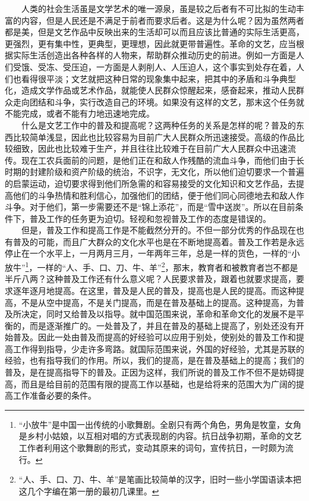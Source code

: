 \documentclass[cn,11pt,chinese]{elegantbook}
\begin{document}
　　人类的社会生活虽是文学艺术的唯一源泉，虽是较之后者有不可比拟的生动丰富的内容，但是人民还是不满足于前者而要求后者。这是为什么呢？因为虽然两者都是美，但是文艺作品中反映出来的生活却可以而且应该比普通的实际生活更高，更强烈，更有集中性，更典型，更理想，因此就更带普遍性。革命的文艺，应当根据实际生活创造出各种各样的人物来，帮助群众推动历史的前进。例如一方面是人们受饿、受冻、受压迫，一方面是人剥削人、人压迫人，这个事实到处存在着，人们也看得很平淡；文艺就把这种日常的现象集中起来，把其中的矛盾和斗争典型化，造成文学作品或艺术作品，就能使人民群众惊醒起来，感奋起来，推动人民群众走向团结和斗争，实行改造自己的环境。如果没有这样的文艺，那末这个任务就不能完成，或者不能有力地迅速地完成。\\
　　什么是文艺工作中的普及和提高呢？这两种任务的关系是怎样的呢？普及的东西比较简单浅显，因此也比较容易为目前广大人民群众所迅速接受。高级的作品比较细致，因此也比较难于生产，并且往往比较难于在目前广大人民群众中迅速流传。现在工农兵面前的问题，是他们正在和敌人作残酷的流血斗争，而他们由于长时期的封建阶级和资产阶级的统治，不识字，无文化，所以他们迫切要求一个普遍的启蒙运动，迫切要求得到他们所急需的和容易接受的文化知识和文艺作品，去提高他们的斗争热情和胜利信心，加强他们的团结，便于他们同心同德地去和敌人作斗争。对于他们，第一步需要还不是“锦上添花”，而是“雪中送炭”。所以在目前条件下，普及工作的任务更为迫切。轻视和忽视普及工作的态度是错误的。\\
　　但是，普及工作和提高工作是不能截然分开的。不但一部分优秀的作品现在也有普及的可能，而且广大群众的文化水平也是在不断地提高着。普及工作若是永远停止在一个水平上，一月两月三月，一年两年三年，总是一样的货色，一样的“小放牛”\footnote[7]{ “小放牛”是中国一出传统的小歌舞剧。全剧只有两个角色，男角是牧童，女角是乡村小姑娘，以互相对唱的方式表现剧的内容。抗日战争初期，革命的文艺工作者利用这个歌舞剧的形式，变动其原来的词句，宣传抗日，一时颇为流行。}，一样的“人、手、口、刀、牛、羊”\footnote[8]{ “人、手、口、刀、牛、羊”是笔画比较简单的汉字，旧时一些小学国语读本把这几个字编在第一册的最初几课里。}，那末，教育者和被教育者岂不都是半斤八两？这种普及工作还有什么意义呢？人民要求普及，跟着也就要求提高，要求逐年逐月地提高。在这里，普及是人民的普及，提高也是人民的提高。而这种提高，不是从空中提高，不是关门提高，而是在普及基础上的提高。这种提高，为普及所决定，同时又给普及以指导。就中国范围来说，革命和革命文化的发展不是平衡的，而是逐渐推广的。一处普及了，并且在普及的基础上提高了，别处还没有开始普及。因此一处由普及而提高的好经验可以应用于别处，使别处的普及工作和提高工作得到指导，少走许多弯路。就国际范围来说，外国的好经验，尤其是苏联的经验，也有指导我们的作用。所以，我们的提高，是在普及基础上的提高；我们的普及，是在提高指导下的普及。正因为这样，我们所说的普及工作不但不是妨碍提高，而且是给目前的范围有限的提高工作以基础，也是给将来的范围大为广阔的提高工作准备必要的条件。\\
\end{document}
